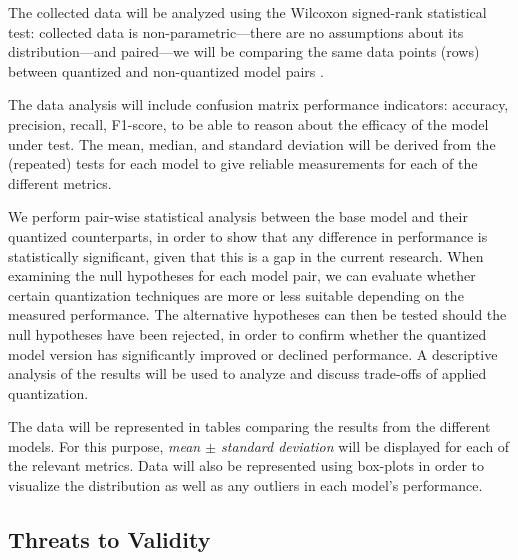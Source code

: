 \documentclass[conference]{IEEEtran}
\begin{document}
The collected data will be analyzed using the Wilcoxon signed-rank statistical
test: collected data is non-parametric---there are no assumptions about its
distribution---and paired---we will be comparing the same data points
(rows) between quantized and non-quantized model pairs
\cite{wohlin2012experimentation}. %

The data analysis will include confusion matrix performance indicators:
accuracy, precision, recall, F1-score, to be able to reason about the efficacy
of the model under test. The mean, median, and standard deviation will be
derived from the (repeated) tests for each model to give reliable measurements for
each of the different metrics. 

We perform pair-wise statistical analysis between the base model and their quantized counterparts, in order to show that any difference in performance is statistically significant, given that this is a gap in the current research. When examining the null hypotheses for each model pair, we can evaluate whether certain quantization techniques are more or less suitable depending on the measured performance. The alternative hypotheses can then be tested should the null hypotheses have been rejected, in order to confirm whether the quantized model version has significantly improved or declined performance. A descriptive analysis of the results will be used to analyze and discuss trade-offs of applied quantization. 

The data will be represented in tables comparing
the results from the different models. For this purpose, \textit{mean $\pm$ standard
deviation} will be displayed for each of the relevant metrics. Data will also be
represented using box-plots in order to visualize the distribution as well as
any outliers in each model's performance. 


\subsection{Threats to Validity}
\end{document}
